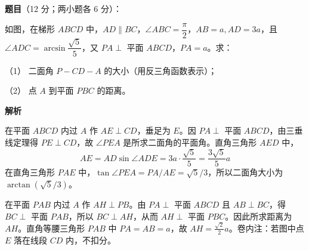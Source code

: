 \begin{answer}

\textbf{题目}（12 分；两小题各 6 分）：

如图，在梯形 \(ABCD\) 中，\(AD\parallel BC\)，\(\angle ABC=\dfrac\pi2\)，\(AB=a,AD=3a\)，且 \(\angle ADC=\arcsin\dfrac{\sqrt5}{5}\)，又 \(PA\perp\) 平面 \(ABCD\)，\(PA=a\)。求：

（1） 二面角 \(P-CD-A\) 的大小（用反三角函数表示）；

（2） 点 \(A\) 到平面 \(PBC\) 的距离。
\nopagebreak[4]
\begin{center}\end{center}
\nopagebreak[4]
\textbf{解析}


在平面 \(ABCD\) 内过 \(A\) 作 \(AE\perp CD\)，垂足为 \(E\)。因 \(PA\perp\) 平面 \(ABCD\)，由三垂线定理得 \(PE\perp CD\)，故 \(\angle PEA\) 是所求二面角的平面角。直角三角形 \(AED\) 中，
\nopagebreak[4]
\[
AE=AD\sin\angle ADE=3a\cdot\frac{\sqrt5}{5}=\frac{3\sqrt5}{5}a
\]
在直角三角形 \(PAE\) 中，\(\tan\angle PEA=PA/AE=\sqrt5/3\)，所以二面角大小为 \(\arctan(\sqrt5/3)\)。


在平面 \(PAB\) 内过 \(A\) 作 \(AH\perp PB\)。由 \(PA\perp\) 平面 \(ABCD\) 且 \(AB\perp BC\)，得 \(BC\perp\) 平面 \(PAB\)，所以 \(BC\perp AH\)，从而 \(AH\perp\) 平面 \(PBC\)。因此所求距离为 \(AH\)。直角等腰三角形 \(PAB\) 中 \(PA=AB=a\)，故 \(AH=\frac{\sqrt2}{2}a\)。卷内注：若图中点 \(E\) 落在线段 \(CD\) 内，不扣分。



\end{answer}
